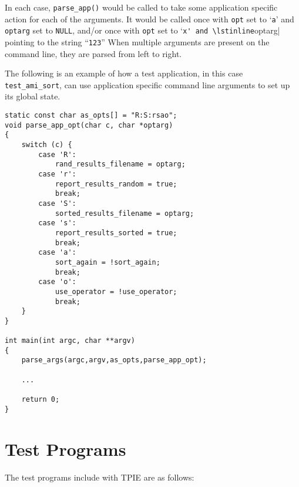 In each case, \lstinline|parse_app()| would be called to take some
application specific action for each of the arguments.  It would be
called once with \lstinline|opt| set to `\lstinline|a|' and
\lstinline|optarg| set to \lstinline|NULL|, and/or once with
\lstinline|opt| set to `\lstinline|x' and \lstinline|optarg| pointing
to the string ``\lstinline|123|''  When multiple arguments are present
on the command line, they are parsed from left to right.

The following is an example of how a test application, in this case
\lstinline|test_ami_sort|, can use application specific command line
arguments to set up its global state.

\begin{lstlisting}
static const char as_opts[] = "R:S:rsao";
void parse_app_opt(char c, char *optarg)
{
    switch (c) {
        case 'R':
            rand_results_filename = optarg;
        case 'r':
            report_results_random = true;
            break;
        case 'S':
            sorted_results_filename = optarg;
        case 's':
            report_results_sorted = true;
            break;
        case 'a':
            sort_again = !sort_again;
            break;
        case 'o':
            use_operator = !use_operator;
            break;
    }
}

int main(int argc, char **argv)
{
    parse_args(argc,argv,as_opts,parse_app_opt);

    ...

    return 0;
}
\end{lstlisting}

\section{Test Programs}

The test programs include with TPIE are as follows:

